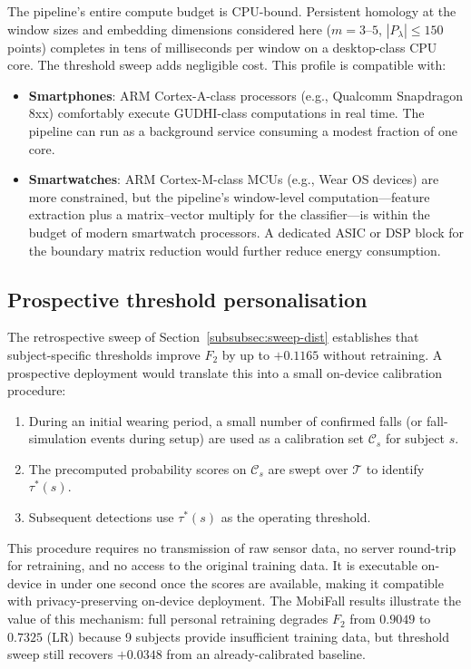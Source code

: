 \documentclass[onluarkali,ingilizce,yukseklisans,karton,LisansustuEgitim]{itutez}
\providecommand{\1}{\mathbf{1}}
\providecommand{\T}{\mathcal{T}}
\begin{document}
The pipeline's entire compute budget is CPU-bound.  Persistent homology at the
window sizes and embedding dimensions considered here ($m=3$--$5$,
$|P_\lambda|\leq150$ points) completes in tens of milliseconds per window on a
desktop-class CPU core.  The threshold sweep adds negligible cost.  This profile is
compatible with:
\begin{itemize}
  \item \textbf{Smartphones}: ARM Cortex-A-class processors (e.g., Qualcomm
    Snapdragon 8xx) comfortably execute GUDHI-class computations in real time.
    The pipeline can run as a background service consuming a modest fraction of
    one core.
  \item \textbf{Smartwatches}: ARM Cortex-M-class MCUs (e.g., Wear OS devices)
    are more constrained, but the pipeline's window-level computation---feature
    extraction plus a matrix--vector multiply for the classifier---is within the
    budget of modern smartwatch processors.  A dedicated ASIC or DSP block for the
    boundary matrix reduction would further reduce energy consumption.
\end{itemize}

\subsection{Prospective threshold personalisation}

The retrospective sweep of Section~\ref{subsubsec:sweep-dist} establishes that
subject-specific thresholds improve $F_2$ by up to $+0.1165$ without retraining.
A prospective deployment would translate this into a small on-device calibration
procedure:
\begin{enumerate}
  \item During an initial wearing period, a small number of confirmed falls (or
    fall-simulation events during setup) are used as a calibration set $\mathcal{C}_s$
    for subject $s$.
  \item The precomputed probability scores on $\mathcal{C}_s$ are swept over
    $\T$ to identify $\tau^*(s)$.
  \item Subsequent detections use $\tau^*(s)$ as the operating threshold.
\end{enumerate}
This procedure requires no transmission of raw sensor data, no server round-trip for
retraining, and no access to the original training data.  It is executable on-device
in under one second once the scores are available, making it compatible with
privacy-preserving on-device deployment.  The MobiFall results illustrate the value
of this mechanism: full personal retraining degrades $F_2$ from $0.9049$ to $0.7325$
(LR) because 9 subjects provide insufficient training data, but threshold sweep
still recovers $+0.0348$ from an already-calibrated baseline.
\end{document}
